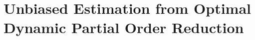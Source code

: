 \documentclass[acmsmall]{acmart}
\begin{document}

\section{Unbiased Estimation from Optimal Dynamic Partial Order Reduction}
\label{trust_sec}
\end{document}
